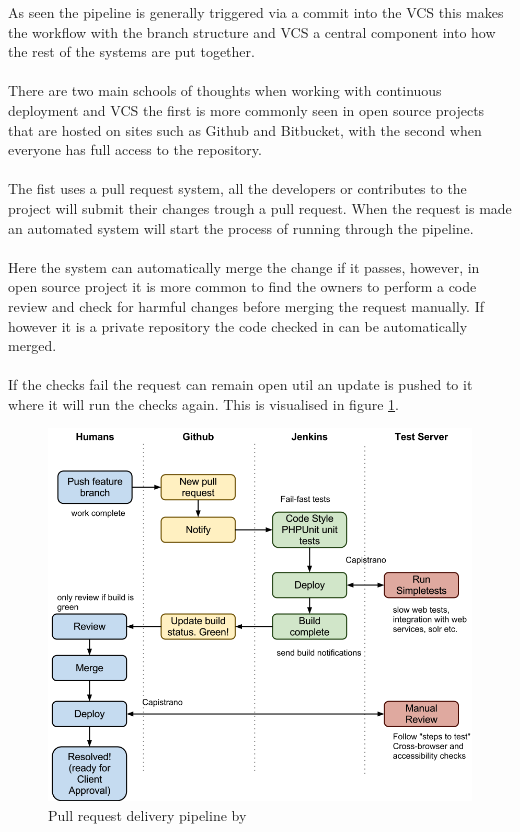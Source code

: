 As seen the pipeline is generally triggered via a commit into the VCS this makes the workflow with the branch structure and VCS a central component into how the rest of the systems are put together.
\\\\
There are two main schools of thoughts when working with continuous deployment and VCS the first is more commonly seen in open source projects that are hosted on sites such as Github and Bitbucket, with the second when everyone has full access to the repository. 
\\\\
The fist uses a pull request system, all the developers or contributes to the project will submit their changes trough a pull request. When the request is made an automated system will start the process of running through the pipeline. 
\\\\
Here the system can automatically merge the change if it passes, however, in open source project it is more common to find the owners to perform a code review and check for harmful changes before merging the request manually. If however it is a private repository the code checked in can be automatically merged. 
\\\\
If the checks fail the request can remain open util an update is pushed to it where it will run the checks again. This is visualised in figure \ref{fig:osspipeline}.

\begin{figure}[H]
	\centering
	\includegraphics[scale=0.4]{images/osspipeline.png}
	\caption{Pull request delivery pipeline by \cite{osspipeline}}
	\label{fig:osspipeline}
\end{figure}

